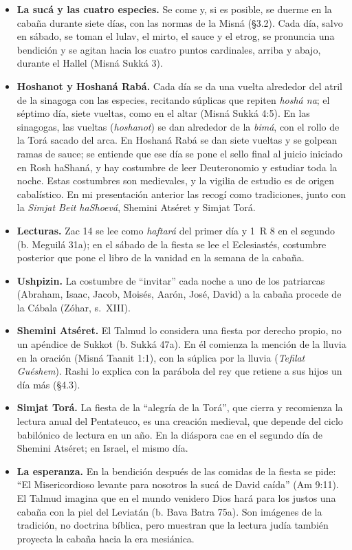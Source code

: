 \documentclass[11pt,letterpaper]{article}
\begin{document}
\begin{itemize}
\item \textbf{La sucá y las cuatro especies.} Se come y, si es posible, se duerme en la cabaña durante siete días, con las normas de la Misná (§3.2). Cada día, salvo en sábado, se toman el lulav, el mirto, el sauce y el etrog, se pronuncia una bendición y se agitan hacia los cuatro puntos cardinales, arriba y abajo, durante el Hallel (Misná Sukká 3).
\item \textbf{Hoshanot y Hoshaná Rabá.} Cada día se da una vuelta alrededor del atril de la sinagoga con las especies, recitando súplicas que repiten \emph{hoshá na}; el séptimo día, siete vueltas, como en el altar (Misná Sukká 4:5). En las sinagogas, las vueltas (\emph{hoshanot}) se dan alrededor de la \emph{bimá}, con el rollo de la Torá sacado del arca. En Hoshaná Rabá se dan siete vueltas y se golpean ramas de sauce; se entiende que ese día se pone el sello final al juicio iniciado en Rosh haShaná, y hay costumbre de leer Deuteronomio y estudiar toda la noche. Estas costumbres son medievales, y la vigilia de estudio es de origen cabalístico. En mi presentación anterior las recogí como tradiciones, junto con la \emph{Simjat Beit haShoevá}, Shemini Atséret y Simjat Torá.
\item \textbf{Lecturas.} Zac 14 se lee como \emph{haftará} del primer día y 1~R 8 en el segundo (b. Meguilá 31a); en el sábado de la fiesta se lee el Eclesiastés, costumbre posterior que pone el libro de la vanidad en la semana de la cabaña.
\item \textbf{Ushpizin.} La costumbre de ``invitar'' cada noche a uno de los patriarcas (Abraham, Isaac, Jacob, Moisés, Aarón, José, David) a la cabaña procede de la Cábala (Zóhar, s.~XIII).
\item \textbf{Shemini Atséret.} El Talmud lo considera una fiesta por derecho propio, no un apéndice de Sukkot (b. Sukká 47a). En él comienza la mención de la lluvia en la oración (Misná Taanit 1:1), con la súplica por la lluvia (\emph{Tefilat Guéshem}). Rashi lo explica con la parábola del rey que retiene a sus hijos un día más (§4.3).
\item \textbf{Simjat Torá.} La fiesta de la ``alegría de la Torá'', que cierra y recomienza la lectura anual del Pentateuco, es una creación medieval, que depende del ciclo babilónico de lectura en un año. En la diáspora cae en el segundo día de Shemini Atséret; en Israel, el mismo día.
\item \textbf{La esperanza.} En la bendición después de las comidas de la fiesta se pide: ``El Misericordioso levante para nosotros la sucá de David caída'' (Am 9:11). El Talmud imagina que en el mundo venidero Dios hará para los justos una cabaña con la piel del Leviatán (b. Bava Batra 75a). Son imágenes de la tradición, no doctrina bíblica, pero muestran que la lectura judía también proyecta la cabaña hacia la era mesiánica.
\end{itemize}
\end{document}
